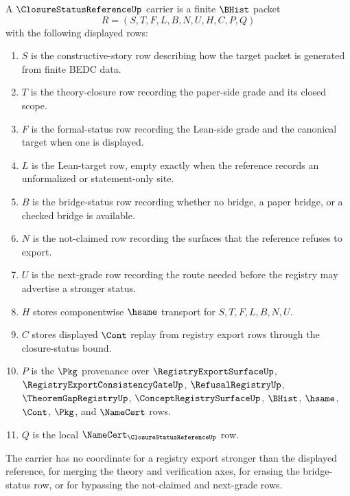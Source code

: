 \begin{definition}
\label{def:closure-status-reference-carrier}
A $\ClosureStatusReferenceUp$ carrier is a finite $\BHist$ packet
$$
R=(S,T,F,L,B,N,U,H,C,P,Q)
$$
with the following displayed rows:
\begin{enumerate}
\item $S$ is the constructive-story row describing how the target packet is generated from finite BEDC data.
\item $T$ is the theory-closure row recording the paper-side grade and its closed scope.
\item $F$ is the formal-status row recording the Lean-side grade and the canonical target when one is displayed.
\item $L$ is the Lean-target row, empty exactly when the reference records an unformalized or statement-only site.
\item $B$ is the bridge-status row recording whether no bridge, a paper bridge, or a checked bridge is available.
\item $N$ is the not-claimed row recording the surfaces that the reference refuses to export.
\item $U$ is the next-grade row recording the route needed before the registry may advertise a stronger status.
\item $H$ stores componentwise $\hsame$ transport for $S,T,F,L,B,N,U$.
\item $C$ stores displayed $\Cont$ replay from registry export rows through the closure-status bound.
\item $P$ is the $\Pkg$ provenance over $\RegistryExportSurfaceUp$, $\RegistryExportConsistencyGateUp$, $\RefusalRegistryUp$, $\TheoremGapRegistryUp$, $\ConceptRegistrySurfaceUp$, $\BHist$, $\hsame$, $\Cont$, $\Pkg$, and $\NameCert$ rows.
\item $Q$ is the local $\NameCert_{\ClosureStatusReferenceUp}$ row.
\end{enumerate}
The carrier has no coordinate for a registry export stronger than the displayed reference, for merging the theory and verification axes, for erasing the bridge-status row, or for bypassing the not-claimed and next-grade rows.
\end{definition}

